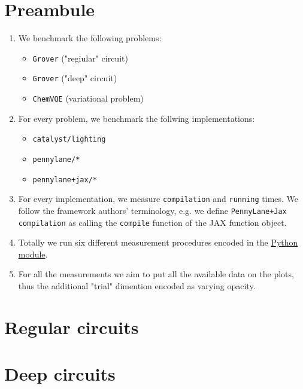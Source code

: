 \documentclass{article}
\renewcommand{\t}[1]{\texttt{#1}}
\newcommand{\SYSHASH}{628f56}
\newcommand{\TAG}{1003}
\newcommand{\bmimage}[1]{
    \begin{center}
    
    \end{center}}
\begin{document}
\tableofcontents

\section{Preambule}

\begin{enumerate}
    \item We benchmark the following problems:
        \begin{itemize}
            \item \t{Grover} ("regiular" circuit)
            \item \t{Grover} ("deep" circuit)
            \item \t{ChemVQE} (variational problem)
        \end{itemize}
    \item For every problem, we benchmark the follwing implementations:
        \begin{itemize}
            \item \t{catalyst/lighting}
            \item \t{pennylane/*}
            \item \t{pennylane+jax/*}
        \end{itemize}
    \item For every implementation, we measure \t{compilation} and \t{running} times. We follow the
    framework authors' terminology, e.g. we define \t{PennyLane+Jax compilation} as calling the
    \t{compile} function of the JAX function object.

    \item Totally we run six different measurement procedures encoded in the
    \href{https://github.com/XanaduAI/pennylane-mlir/blob/benchmarking-1-2/benchmark/catalyst_benchmark/main.py#L84}{Python module}.

    \item For all the measurements we aim to put all the available data on the plots, thus the
        additional "trial" dimention encoded as varying opacity.
\end{enumerate}

\pagebreak
\section{Regular circuits}

\bmimage{regular_compile}

\bmimage{regular_runtime}


\pagebreak
\section{Deep circuits}
\end{document}
